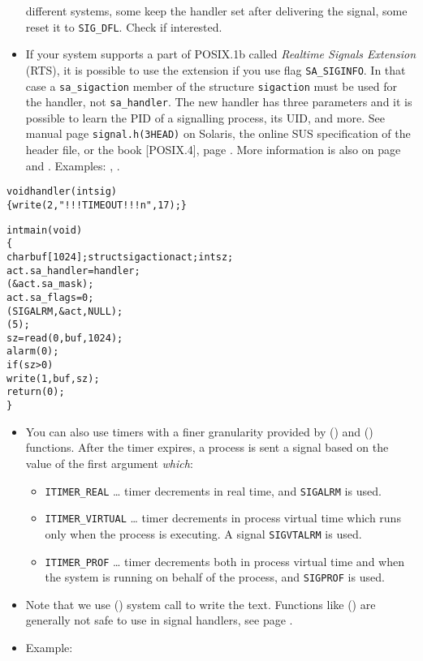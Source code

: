 \begin{itemize}
different systems, some keep the handler set after delivering the signal, some
reset it to \texttt{SIG\_DFL}.  Check  if
interested.
\item \label{REALTIMEEXTENSIONS} If your system supports a part of POSIX.1b
called \emph{Realtime Signals Extension} (RTS), it is possible to use the
extension if you use flag \texttt{SA\_SIGINFO}.  In that case a
\texttt{sa\_sigaction} member of the structure \texttt{sigaction} must be used
for the handler, not \texttt{sa\_handler}.  The new handler has three parameters
and it is possible to learn the PID of a signalling process, its UID, and more.
See manual page \texttt{signal.h(3HEAD)} on Solaris, the online SUS
specification of the header file, or the book [POSIX.4], page
\pageref{REF_PROGRAMMING}.  More information is also on page \pageref{POSIX} and
\pageref{SIGWAITINFO}.  Examples: ,
.
\end{itemize}


\begin{slide}
\setlength{\baselineskip}{0.8\baselineskip}
\begin{alltt}
void handler(int sig)
\{ write(2," !!! TIMEOUT !!! \bs{}n", 17); \}

int main(void) 
\{
    char buf[1024]; struct sigaction act; int sz;
    act.sa\_handler = handler;
    (&act.sa\_mask);
    act.sa\_flags = 0;
    (SIGALRM, &act, NULL);
    (5);
    sz = read(0, buf, 1024);
    alarm(0);
    if (sz > 0)
        write(1, buf, sz);
    return (0);
\}
\end{alltt}
\end{slide}

\label{SIGALRM}

\begin{itemize}
\item You can also use timers with a finer granularity provided by
() and () functions.  After the timer expires,
a process is sent a signal based on the value of the first argument
\emph{which}:
\begin{itemize}
\item \texttt{ITIMER\_REAL} \dots{} timer decrements in real time, and
\texttt{SIGALRM} is used.
\item \texttt{ITIMER\_VIRTUAL} \dots{} timer decrements in process virtual time
which runs only when the process is executing.  A signal \texttt{SIGVTALRM} is
used.
\item \texttt{ITIMER\_PROF} \dots{} timer decrements both in process virtual
time and when the system is running on behalf of the process, and
\texttt{SIGPROF} is used.
\end{itemize}
\item Note that we use () system call to write the text.  Functions
like () are generally not safe to use in signal handlers, see page
\pageref{ASYNCSIGNALSAFE}.
\item Example: 
\end{itemize}

